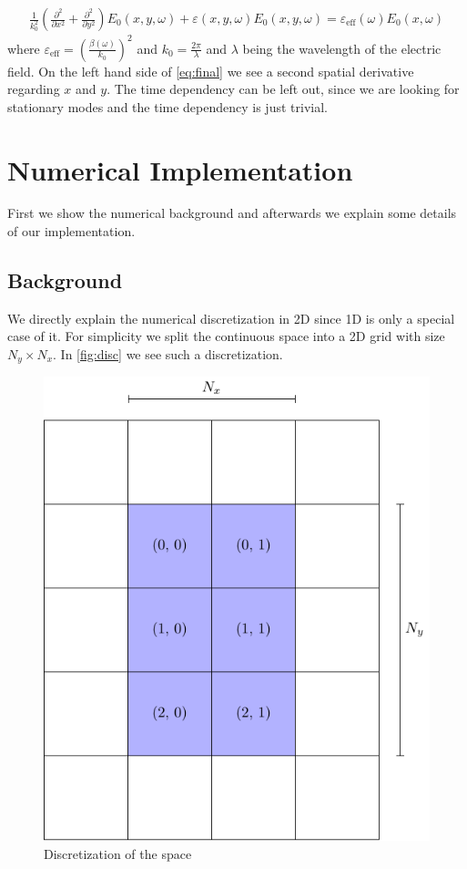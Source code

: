 \documentclass[a4paper,12pt]{scrartcl}
\begin{document}
    \begin{align}
        \frac1{k_0^2} \left(\frac{\partial^2}{\partial x^2}+ \frac{\partial^2}{\partial y^2}\right) E_0(x,y, \omega)+ \varepsilon(x, y, \omega) E_0(x, y, \omega) = \varepsilon_{\text{eff}}(\omega) E_0(x, \omega)
        \label{eq:final}
    \end{align}
    where $\varepsilon_{\text{eff}}=\left(\frac{\beta(\omega)}{k_0}\right)^2$
    and $k_0 = \frac{2\pi}{\lambda}$ and $\lambda$ being the wavelength of the electric field.
    On the left hand side of \autoref{eq:final} we see a second spatial derivative regarding $x$ and $y$.
    The time dependency can be left out, since we are looking for stationary modes and the time dependency is just trivial.
    
\section{Numerical Implementation}
    First we show the numerical background and afterwards we explain some details of our implementation.
    \subsection{Background}
    We directly explain the numerical discretization in 2D since 1D is only a special case of it. For simplicity we split the continuous space into a 2D grid with size $N_y \times N_x$. In \autoref{fig:disc} we see such a discretization.
     \begin{figure}[h]
        \centering
        \includegraphics[width=.5\textwidth]{figures/2d-grid.pdf}
        \caption{Discretization of the space}
        \label{fig:disc}
    \end{figure}
    
\end{document}
